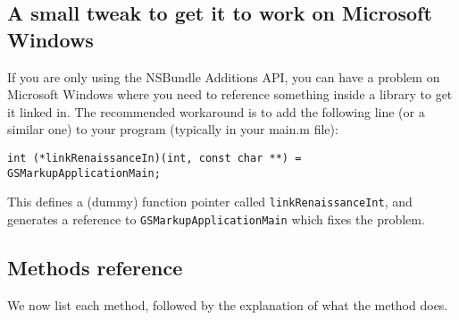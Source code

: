\subsection{A small tweak to get it to work on Microsoft Windows}
If you are only using the NSBundle Additions API, you can have a
problem on Microsoft Windows where you need to reference something
inside a library to get it linked in.  The recommended workaround is
to add the following line (or a similar one) to your program
(typically in your main.m file):
\begin{verbatim}
int (*linkRenaissanceIn)(int, const char **) = GSMarkupApplicationMain;
\end{verbatim}
This defines a (dummy) function pointer called
\texttt{linkRenaissanceInt}, and generates a reference to
\texttt{GSMarkupApplicationMain} which fixes the problem.

\subsection{Methods reference}
We now list each method, followed by the explanation of what the
method does.

